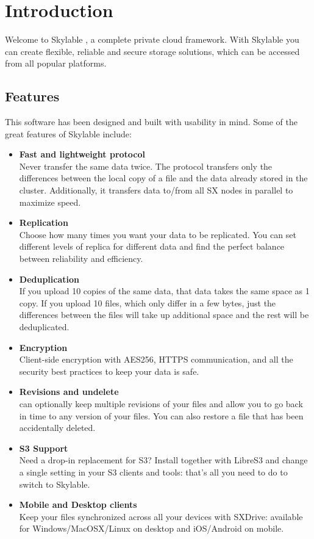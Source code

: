 \chapter{Introduction}
Welcome to Skylable \SX, a complete private cloud framework. With Skylable \SX
you can create flexible, reliable and secure storage solutions, which can
be accessed from all popular platforms.

\section{\SX Features}
This software has been designed and built with usability in mind. Some
of the great features of Skylable \SX include:
\begin{itemize}
    \item \textbf{Fast and lightweight protocol}\\
    Never transfer the same data twice. The \SX protocol transfers only the
    differences between the local copy of a file and the data already stored
    in the cluster. Additionally, it transfers data to/from all SX nodes in
    parallel to maximize speed.

    \item \textbf{Replication}\\
    Choose how many times you want your data to be replicated. You can set
    different levels of replica for different data and find the perfect
    balance between reliability and efficiency.

    \item \textbf{Deduplication}\\
    If you upload 10 copies of the same data, that data takes the same
    space as 1 copy. If you upload 10 files, which only differ in a few bytes,
    just the differences between the files will take up additional space and
    the rest will be deduplicated.

    \item \textbf{Encryption}\\
    Client-side encryption with AES256, HTTPS communication, and all the
    security best practices to keep your data is safe.

    \item \textbf{Revisions and undelete}\\
    \SX can optionally keep multiple revisions of your files and allow you to
    go back in time to any version of your files. You can also restore a file
    that has been accidentally deleted.

    \item \textbf{S3 Support}\\
    Need a drop-in replacement for S3? Install \SX together with LibreS3 and
    change a single setting in your S3 clients and tools: that's all you need
    to do to switch to Skylable.

    \item \textbf{Mobile and Desktop clients}\\
    Keep your files synchronized across all your devices with SXDrive: available
    for Windows/MacOSX/Linux on desktop and iOS/Android on mobile.
\end{itemize}


